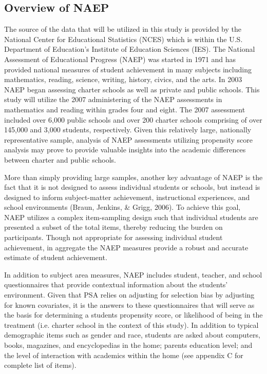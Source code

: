 \documentclass[letterpaper,12p,twoside]{article} %
\begin{document}
\subsection{Overview of NAEP}
The source of the data that will be utilized in this study is provided by the National Center for Educational Statistics (NCES) which is within the U.S. Department of Education's Institute of Education Sciences (IES). The National Assessment of Educational Progress (NAEP) was started in 1971 and has provided national measures of student achievement in many subjects including mathematics, reading, science, writing, history, civics, and the arts. In 2003 NAEP began assessing charter schools as well as private and public schools. This study will utilize the 2007 administering of the NAEP assessments in mathematics and reading within grades four and eight. The 2007 assessment included over 6,000 public schools and over 200 charter schools comprising of over 145,000 and 3,000 students, respectively. Given this relatively large, nationally representative sample, analysis of NAEP assessments utilizing propensity score analysis may prove to provide valuable insights into the academic differences between charter and public schools.

More than simply providing large samples, another key advantage of NAEP is the fact that it is not designed to assess individual students or schools, but instead is designed to inform subject-matter achievement, instructional experiences, and school environments (Braun, Jenkins, \& Grigg, 2006). To achieve this goal, NAEP utilizes a complex item-sampling design such that individual students are presented a subset of the total items, thereby reducing the burden on participants. Though not appropriate for assessing individual student achievement, in aggregate the NAEP measures provide a robust and accurate estimate of student achievement.

In addition to subject area measures, NAEP includes student, teacher, and school questionnaires that provide contextual information about the students' environment. Given that PSA relies on adjusting for selection bias by adjusting for known covariates, it is the answers to these questionnaires that will serve as the basis for determining a students propensity score, or likelihood of being in the treatment (i.e. charter school in the context of this study). In addition to typical demographic items such as gender and race, students are asked about computers, books, magazines, and encyclopedias in the home; parents education level; and the level of interaction with academics within the home (see appendix C for complete list of items).
\end{document}
